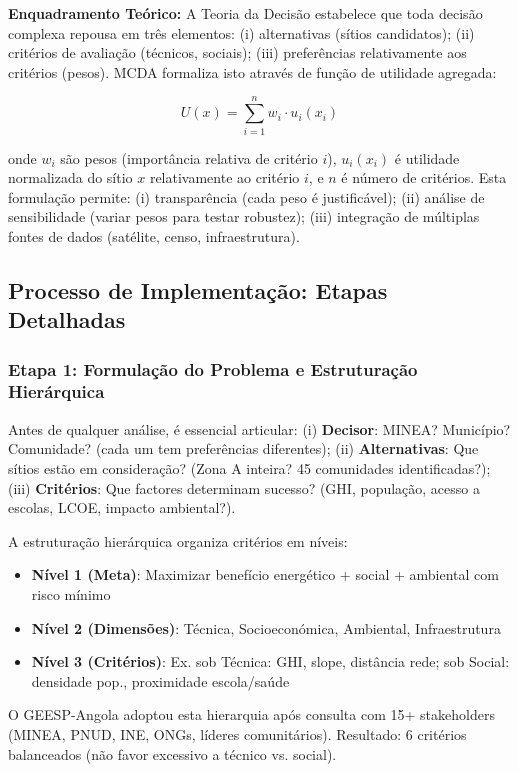 \documentclass[12pt, a4paper]{article}
\begin{document}
\textbf{Enquadramento Teórico:} A Teoria da Decisão estabelece que toda decisão complexa repousa em três elementos: (i) alternativas (sítios candidatos); (ii) critérios de avaliação (técnicos, sociais); (iii) preferências relativamente aos critérios (pesos). MCDA formaliza isto através de função de utilidade agregada:

\begin{equation}
U(x) = \sum_{i=1}^{n} w_i \cdot u_i(x_i)
\end{equation}

onde $w_i$ são pesos (importância relativa de critério $i$), $u_i(x_i)$ é utilidade normalizada do sítio $x$ relativamente ao critério $i$, e $n$ é número de critérios. Esta formulação permite: (i) transparência (cada peso é justificável); (ii) análise de sensibilidade (variar pesos para testar robustez); (iii) integração de múltiplas fontes de dados (satélite, censo, infraestrutura).

\subsection{Processo de Implementação: Etapas Detalhadas}

\subsubsection{Etapa 1: Formulação do Problema e Estruturação Hierárquica}
Antes de qualquer análise, é essencial articular: (i) \textbf{Decisor}: MINEA? Município? Comunidade? (cada um tem preferências diferentes); (ii) \textbf{Alternativas}: Que sítios estão em consideração? (Zona A inteira? 45 comunidades identificadas?); (iii) \textbf{Critérios}: Que factores determinam sucesso? (GHI, população, acesso a escolas, LCOE, impacto ambiental?).

A estruturação hierárquica organiza critérios em níveis:
\begin{itemize}
\item \textbf{Nível 1 (Meta)}: Maximizar benefício energético + social + ambiental com risco mínimo
\item \textbf{Nível 2 (Dimensões)}: Técnica, Socioeconómica, Ambiental, Infraestrutura
\item \textbf{Nível 3 (Critérios)}: Ex. sob Técnica: GHI, slope, distância rede; sob Social: densidade pop., proximidade escola/saúde
\end{itemize}

O GEESP-Angola adoptou esta hierarquia após consulta com 15+ stakeholders (MINEA, PNUD, INE, ONGs, líderes comunitários). Resultado: 6 critérios balanceados (não favor excessivo a técnico vs. social).
\end{document}
